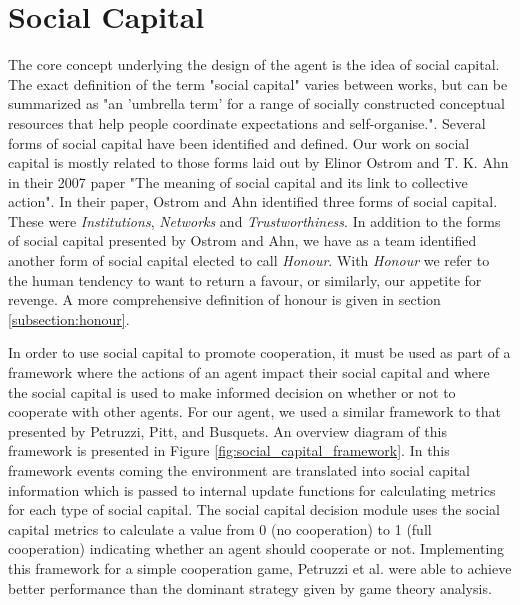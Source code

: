 \section{Social Capital}

The core concept underlying the design of the agent is the idea of social capital. The exact definition of the term "social capital" varies between works, but can be summarized as "an 'umbrella term' for a range of socially constructed conceptual resources that help people coordinate expectations and self-organise."\cite{pitt}. Several forms of social capital have been identified and defined. Our work on social capital is mostly related to those forms laid out by Elinor Ostrom and T. K. Ahn in their 2007 paper "The meaning of social capital and its link to collective action". \cite{ostrom-ahn} In their paper, Ostrom and Ahn identified three forms of social capital. These were \emph{Institutions}, \emph{Networks} and \emph{Trustworthiness}. In addition to the forms of social capital presented by Ostrom and Ahn, we have as a team identified another form of social capital elected to call \emph{Honour}. With \emph{Honour} we refer to the human tendency to want to return a favour, or similarly, our appetite for revenge. A more comprehensive definition of honour is given in section \ref{subsection:honour}. 

In order to use social capital to promote cooperation, it must be used as part of a framework where the actions of an agent impact their social capital and where the social capital is used to make informed decision on whether or not to cooperate with other agents. For our agent, we used a similar framework to that presented by Petruzzi, Pitt, and Busquets\cite{complexity_reduction}. An overview diagram of this framework is presented in Figure \ref{fig:social_capital_framework}. In this framework events coming the environment are translated into social capital information which is passed to internal update functions for calculating metrics for each type of social capital. The social capital decision module uses the social capital metrics to calculate a value from 0 (no cooperation) to 1 (full cooperation) indicating whether an agent should cooperate or not. Implementing this framework for a simple cooperation game, Petruzzi et al. were able to achieve better performance than the dominant strategy given by game theory analysis. 

